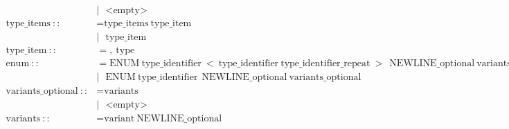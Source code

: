 \documentclass{article}
\begin{document}
\begin{align*}
                                      & |\ \ \ \text{<empty>}                                                                                                                                                                                                     \\
  \text{type\_items}\ ::              & = \text{type\_items}\ \text{type\_item}                                                                                                                                                                                   \\
                                      & |\ \ \ \text{type\_item}                                                                                                                                                                                                  \\
  \text{type\_item}\ ::               & = ,\ \text{type}                                                                                                                                                                                                          \\
  \text{enum}\ ::                     & = \text{ENUM}\ \text{type\_identifier}\ <\ \text{type\_identifier}\ \text{type\_identifier\_repeat}\ >\ {\ \text{NEWLINE\_optional}\ \text{variants\_optional}\ }                                                         \\
                                      & |\ \ \ \text{ENUM}\ \text{type\_identifier}\ {\ \text{NEWLINE\_optional}\ \text{variants\_optional}\ }                                                                                                                    \\
  \text{variants\_optional}\ ::       & = \text{variants}                                                                                                                                                                                                         \\
                                      & |\ \ \ \text{<empty>}                                                                                                                                                                                                     \\
  \text{variants}\ ::                 & = \text{variant}\ \text{NEWLINE\_optional}                                                                                                                                                                                \\

\end{align*}
\end{document}
